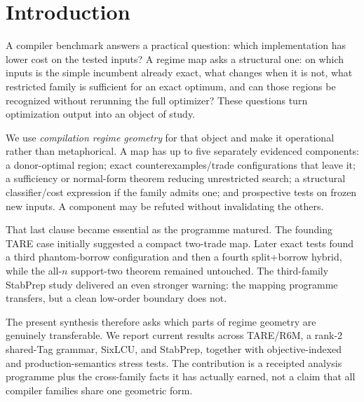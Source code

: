 \section{Introduction}

A compiler benchmark answers a practical question: which implementation has lower cost on the tested inputs? A regime map asks a structural one: on which inputs is the simple incumbent already exact, what changes when it is not, what restricted family is sufficient for an exact optimum, and can those regions be recognized without rerunning the full optimizer? These questions turn optimization output into an object of study.

We use \emph{compilation regime geometry} for that object and make it operational rather than metaphorical. A map has up to five separately evidenced components: a donor-optimal region; exact counterexamples/trade configurations that leave it; a sufficiency or normal-form theorem reducing unrestricted search; a structural classifier/cost expression if the family admits one; and prospective tests on frozen new inputs. A component may be refuted without invalidating the others.

That last clause became essential as the programme matured. The founding TARE case initially suggested a compact two-trade map. Later exact tests found a third phantom-borrow configuration and then a fourth split+borrow hybrid, while the all-$n$ support-two theorem remained untouched. The third-family StabPrep study delivered an even stronger warning: the mapping programme transfers, but a clean low-order boundary does not.

The present synthesis therefore asks which parts of regime geometry are genuinely transferable. We report current results across TARE/R6M, a rank-2 shared-Tag grammar, SixLCU, and StabPrep, together with objective-indexed and production-semantics stress tests. The contribution is a receipted analysis programme plus the cross-family facts it has actually earned, not a claim that all compiler families share one geometric form.